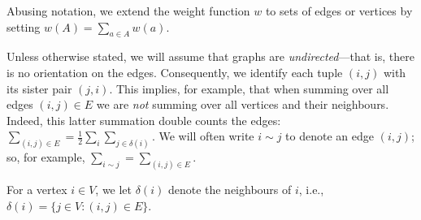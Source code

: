 Abusing notation, we extend the weight function $w$ to sets of edges or vertices by setting $w(A)=\sum_{a\in A}w(a)$. 

Unless otherwise stated, we will assume that graphs are \emph{undirected}---that is, there is no orientation on the edges. Consequently, we identify each tuple $(i,j)$ with its sister pair $(j,i)$. This implies, for example, that when summing over all edges $(i,j)\in E$ we are \emph{not} summing over all vertices and their neighbours. Indeed, this latter summation double counts the edges: $\sum_{(i,j)\in E}=\frac{1}{2}\sum_{i}\sum_{j\in\delta(i)}$. We will often write $i\sim j$ to denote an edge $(i,j)$; so, for example, $\sum_{i\sim j}=\sum_{(i,j)\in E}$. 


For a vertex $i\in V$, we let $\delta(i)$ denote the neighbours of $i$, i.e., $\delta(i)=\{j\in V:(i,j)\in E\}$. 



